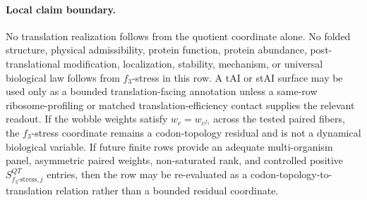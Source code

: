 \paragraph{Local claim boundary.}
No translation realization follows from the quotient coordinate alone.  No folded structure, physical admissibility, protein function, protein abundance, post-translational modification, localization, stability, mechanism, or universal biological law follows from $f_3$-stress in this row.  A tAI or stAI surface may be used only as a bounded translation-facing annotation unless a same-row ribosome-profiling or matched translation-efficiency contact supplies the relevant readout.  If the wobble weights satisfy $w_c=w_{c^{f_3}}$ across the tested paired fibers, the $f_3$-stress coordinate remains a codon-topology residual and is not a dynamical biological variable.  If future finite rows provide an adequate multi-organism panel, asymmetric paired weights, non-saturated rank, and controlled positive $S^{QT}_{f_3\text{-stress},j}$ entries, then the row may be re-evaluated as a codon-topology-to-translation relation rather than a bounded residual coordinate.
